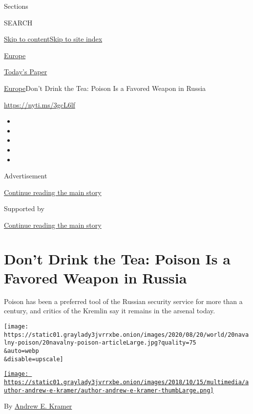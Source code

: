 Sections

SEARCH

\protect\hyperlink{site-content}{Skip to
content}\protect\hyperlink{site-index}{Skip to site index}

\href{https://www.nytimes3xbfgragh.onion/section/world/europe}{Europe}

\href{https://myaccount.nytimes3xbfgragh.onion/auth/login?response_type=cookie\&client_id=vi}{}

\href{https://www.nytimes3xbfgragh.onion/section/todayspaper}{Today's
Paper}

\href{/section/world/europe}{Europe}\textbar{}Don't Drink the Tea:
Poison Is a Favored Weapon in Russia

\url{https://nyti.ms/3gcL6lf}

\begin{itemize}
\item
\item
\item
\item
\item
\end{itemize}

Advertisement

\protect\hyperlink{after-top}{Continue reading the main story}

Supported by

\protect\hyperlink{after-sponsor}{Continue reading the main story}

\hypertarget{dont-drink-the-tea-poison-is-a-favored-weapon-in-russia}{%
\section{Don't Drink the Tea: Poison Is a Favored Weapon in
Russia}\label{dont-drink-the-tea-poison-is-a-favored-weapon-in-russia}}

Poison has been a preferred tool of the Russian security service for
more than a century, and critics of the Kremlin say it remains in the
arsenal today.

\texttt{[image: https://static01.graylady3jvrrxbe.onion/images/2020/08/20/world/20navalny-poison/20navalny-poison-articleLarge.jpg?quality=75\\\&auto=webp\\\&disable=upscale]}

\href{https://www.nytimes3xbfgragh.onion/by/andrew-e-kramer}{\texttt{[image: https://static01.graylady3jvrrxbe.onion/images/2018/10/15/multimedia/author-andrew-e-kramer/author-andrew-e-kramer-thumbLarge.png]}}

By \href{https://www.nytimes3xbfgragh.onion/by/andrew-e-kramer}{Andrew
E. Kramer}

